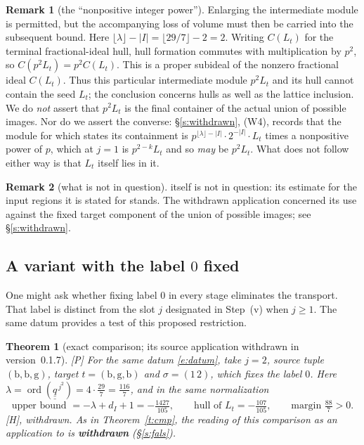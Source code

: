 \documentclass[11pt]{article}
\theoremstyle{plain}
\newtheorem{theorem}{Theorem}
\theoremstyle{definition}
\newtheorem{remark}{Remark}
\newcommand{\ord}{\operatorname{ord}}
\begin{document}
\begin{remark}[the ``nonpositive integer power'']
Enlarging the intermediate module is permitted, but the accompanying loss of
volume must then be carried into the subsequent bound.  Here
$\lfloor\lambda\rfloor-|I|=\lfloor29/7\rfloor-2=2$.
Writing $C(L_t)$ for the terminal fractional-ideal hull, hull formation
commutes with multiplication by $p^2$, so $C(p^2L_t)=p^2C(L_t)$.
This is a proper subideal of the nonzero fractional ideal $C(L_t)$.
Thus this particular intermediate module $p^2L_t$ and its hull cannot contain
the seed $L_t$; the conclusion concerns hulls as well as the lattice inclusion.
We do \emph{not} assert that $p^2L_t$ is the final container of the actual union
of possible images.  Nor do we assert the converse: \S\ref{s:withdrawn},
\textup{(W4)}, records that the module for which
\cite[Thm.~1.10, proof, Step~(v)]{IUT4} states its containment is
$p^{\lfloor\lambda\rfloor-|I|}\cdot2^{-|I|}\cdot L_t$ times a nonpositive power
of $p$, which at $j=1$ is $p^{2-k}L_t$ and so \emph{may} be $p^2L_t$.  What does
not follow either way is that $L_t$ itself lies in it.
\end{remark}

\begin{remark}[what is not in question]
\cite[Prop.~1.4]{IUT4} itself is not in question: its estimate for the input
regions it is stated for stands.  The withdrawn application concerned its use
against the fixed target component of the union of possible images; see
\S\ref{s:withdrawn}.
\end{remark}

\subsection*{A variant with the label $0$ fixed}\label{s:fix0}

One might ask whether fixing label $0$ in every stage eliminates the transport.
That label is distinct from the slot $j$ designated in Step~(v) when $j\ge1$.
The same datum provides a test of this proposed restriction.

\begin{theorem}[exact comparison; its source application withdrawn in
version~0.1.7]\label{t:fix0}
\textup{[P]} For the same datum \eqref{e:datum}, take $j=2$, source tuple
$(\mathrm{b},\mathrm{b},\mathrm{g})$, target $t=(\mathrm{b},\mathrm{g},\mathrm{b})$
and $\sigma=(1\,2)$, which \emph{fixes the label $0$}.  Here
$\lambda=\ord(\underline{\underline q}^{\,j^2})=4\cdot\tfrac{29}{7}=\tfrac{116}{7}$,
and in the same normalization
\[
 \text{upper bound }=-\lambda+d_I+1=-\tfrac{1427}{105},
 \qquad \text{hull of }L_t=-\tfrac{107}{105},
 \qquad\text{margin }\tfrac{88}{7}>0 .
\]
\textup{[H], withdrawn.}  As in Theorem~\ref{t:cmp}, the reading of this
comparison as an application to \cite{IUT4} is \textbf{withdrawn}
(\S\ref{s:fals}).
\end{theorem}
\end{document}
